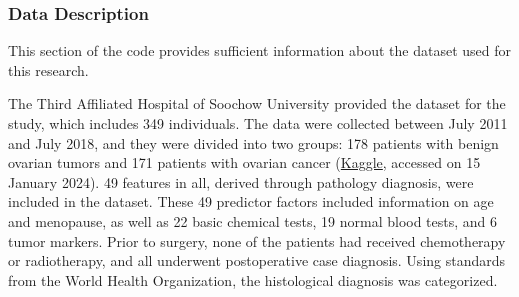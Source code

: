 \documentclass[11pt]{article}
\begin{document}
    \subsubsection{\texorpdfstring{Data Description
}{Data Description }}\label{data-description}

This section of the code provides sufficient information about the
dataset used for this research.

The Third Affiliated Hospital of Soochow University provided the dataset
for the study, which includes 349 individuals. The data were collected
between July 2011 and July 2018, and they were divided into two groups:
178 patients with benign ovarian tumors and 171 patients with ovarian
cancer
(\href{https://www.kaggle.com/datasets/swabbie8/ovarian-cancer/data?select=ovariantotal.csv}{Kaggle},
accessed on 15 January 2024). 49 features in all, derived through
pathology diagnosis, were included in the dataset. These 49 predictor
factors included information on age and menopause, as well as 22 basic
chemical tests, 19 normal blood tests, and 6 tumor markers. Prior to
surgery, none of the patients had received chemotherapy or radiotherapy,
and all underwent postoperative case diagnosis. Using standards from the
World Health Organization, the histological diagnosis was categorized.
\end{document}
